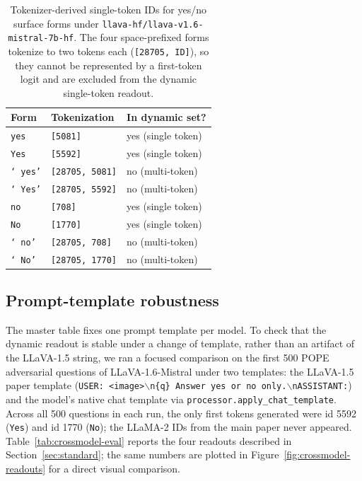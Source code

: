 \documentclass[11pt,letterpaper]{article}
\begin{document}
\begin{table}[h]
\caption{Tokenizer-derived single-token IDs for yes/no surface forms
under \texttt{llava-hf/llava-v1.6-mistral-7b-hf}. The four
space-prefixed forms tokenize to two tokens each
(\texttt{[28705, ID]}), so they cannot be represented by a first-token
logit and are excluded from the dynamic single-token readout.}
\label{tab:crossmodel-tokens}
\centering
\begin{tabular}{lll}
\toprule
Form & Tokenization & In dynamic set? \\
\midrule
\texttt{yes}  & \texttt{[5081]} & yes (single token) \\
\texttt{Yes}  & \texttt{[5592]} & yes (single token) \\
\texttt{`\,yes'} & \texttt{[28705, 5081]} & no (multi-token) \\
\texttt{`\,Yes'} & \texttt{[28705, 5592]} & no (multi-token) \\
\midrule
\texttt{no}   & \texttt{[708]}  & yes (single token) \\
\texttt{No}   & \texttt{[1770]} & yes (single token) \\
\texttt{`\,no'}  & \texttt{[28705, 708]}  & no (multi-token) \\
\texttt{`\,No'}  & \texttt{[28705, 1770]} & no (multi-token) \\
\bottomrule
\end{tabular}
\end{table}

\subsection{Prompt-template robustness}
\label{sec:crossmodel-template}

The master table fixes one prompt template per model. To check that the
dynamic readout is stable under a change of template, rather than an
artifact of the LLaVA-1.5 string, we ran a focused comparison on the
first 500 POPE adversarial questions of LLaVA-1.6-Mistral under two
templates: the LLaVA-1.5 paper template
(\texttt{USER:~<image>$\backslash$n\{q\}~Answer~yes~or~no~only.$\backslash$nASSISTANT:})
and the model's native chat template via
\texttt{processor.apply\_chat\_template}. Across all 500 questions in
each run, the only first tokens generated were id 5592
(\texttt{Yes}) and id 1770 (\texttt{No}); the LLaMA-2 IDs from the
main paper never appeared. Table~\ref{tab:crossmodel-eval} reports the
four readouts described in Section~\ref{sec:standard}; the same
numbers are plotted in Figure~\ref{fig:crossmodel-readouts} for a
direct visual comparison.
\end{document}
